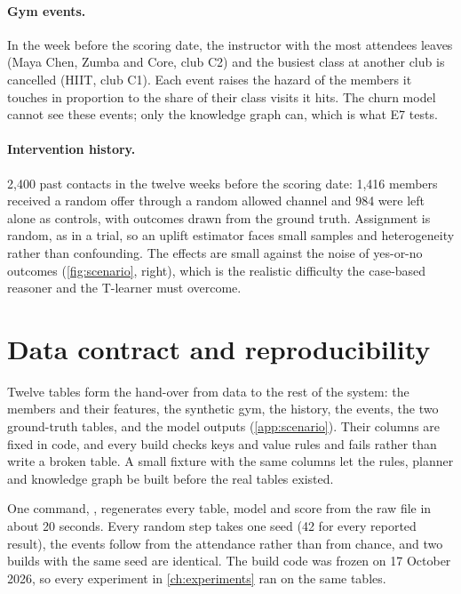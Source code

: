 \paragraph{Gym events.} In the week before the scoring date, the instructor with the most attendees leaves (Maya Chen, Zumba and Core, club C2) and the busiest class at another club is cancelled (HIIT, club C1). Each event raises the hazard of the members it touches in proportion to the share of their class visits it hits. The churn model cannot see these events; only the knowledge graph can, which is what E7 tests.

\paragraph{Intervention history.} 2,400 past contacts in the twelve weeks before the scoring date: 1,416 members received a random offer through a random allowed channel and 984 were left alone as controls, with outcomes drawn from the ground truth. Assignment is random, as in a trial, so an uplift estimator faces small samples and heterogeneity rather than confounding. The effects are small against the noise of yes-or-no outcomes (\cref{fig:scenario}, right), which is the realistic difficulty the case-based reasoner and the T-learner must overcome.


\section{Data contract and reproducibility}

Twelve tables form the hand-over from data to the rest of the system: the members and their features, the synthetic gym, the history, the events, the two ground-truth tables, and the model outputs (\cref{app:scenario}). Their columns are fixed in code, and every build checks keys and value rules and fails rather than write a broken table. A small fixture with the same columns let the rules, planner and knowledge graph be built before the real tables existed.

One command, , regenerates every table, model and score from the raw file in about 20 seconds. Every random step takes one seed (42 for every reported result), the events follow from the attendance rather than from chance, and two builds with the same seed are identical. The build code was frozen on 17 October 2026, so every experiment in \cref{ch:experiments} ran on the same tables.

